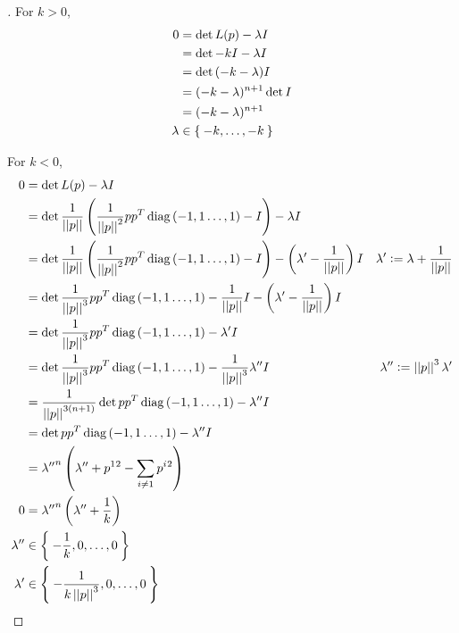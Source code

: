 \documentclass[../main.tex]{subfiles}
\begin{document}
\begin{proof}[]
    \skipped

    For $k>0$,
    \begin{align*}
        0
        &= \det{L(p)-\lambda I} \\
        &= \det{-k I-\lambda I} \\
        &= \det{(-k-\lambda) I} \\
        &= (-k-\lambda)^{n+1}\det{I} \\
        &= (-k-\lambda)^{n+1} \\
        \lambda &\in \Set{-k,\dots,-k}
    \end{align*}

    For $k<0$,
    \begin{align*}
        0
        &= \det{L(p)-\lambda I} \\
        &= \det{\frac{1}{\norm{p}} \left(\frac{1}{\norm{p}^2} p p^T \diag{\left(-1,1\dots,1\right)} - I\right)-\lambda I} \\
        &= \det{\frac{1}{\norm{p}} \left(\frac{1}{\norm{p}^2} p p^T \diag{\left(-1,1\dots,1\right)} - I\right)-\left(\lambda^\prime-\frac{1}{\norm{p}}\right) I} & \text{$\lambda^\prime \defeq \lambda + \frac{1}{\norm{p}}$}\\
        &= \det{\frac{1}{\norm{p}^3} p p^T \diag{\left(-1,1\dots,1\right)} - \frac{1}{\norm{p}}I-\left(\lambda^\prime-\frac{1}{\norm{p}}\right) I}\\
        &= \det{\frac{1}{\norm{p}^3} p p^T \diag{\left(-1,1\dots,1\right)} - \lambda^\prime I}\\
        &= \det{\frac{1}{\norm{p}^3} p p^T \diag{\left(-1,1\dots,1\right)} - \frac{1}{\norm{p}^3}\lambda^{\prime\prime} I} & \text{$\lambda^{\prime\prime} \defeq \norm{p}^3\lambda^\prime$}\\
        &= \frac{1}{\norm{p}^{3(n+1)}}\det{p p^T \diag{\left(-1,1\dots,1\right)} - \lambda^{\prime\prime} I}\\
        &= \det{p p^T \diag{\left(-1,1\dots,1\right)} - \lambda^{\prime\prime} I}\\
        &= {\lambda^{\prime\prime}}^n\left(\lambda^{\prime\prime}+\tensor{p}{^1}^2-\sum_{i\ne 1}{\tensor{p}{^i}^2}\right) \\
        0 &= {\lambda^{\prime\prime}}^n\left(\lambda^{\prime\prime}+\frac{1}{k}\right) \\
        \lambda^{\prime\prime} &\in \Set{-\frac{1}{k},0,\dots,0} \\
        \lambda^\prime &\in \Set{-\frac{1}{k\norm{p}^3},0,\dots,0} \\

\end{align*}
\end{proof}
\end{document}
